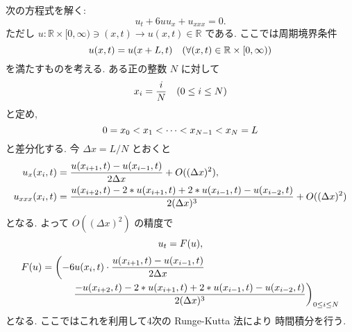 \documentclass[12pt, a4j]{jsarticle}
\newcommand{\R}{\mathbb{R}}
\begin{document}
次の方程式を解く:
\begin{equation}
 u_{t} + 6 u u_{x} + u_{xxx} = 0.
  \label{KdV}
\end{equation}
ただし 
$u:\R \times [0, \infty) \ni (x, t) \to u(x, t) \in \R$
である. ここでは周期境界条件
\begin{equation}
 u(x, t) = u(x + L, t)
  \quad (\forall (x, t) \in \R \times [0, \infty) )
  \notag
\end{equation}
を満たすものを考える. ある正の整数 $N$ に対して
\begin{equation}
 x_{i} = \dfrac{i}{N} \quad (0 \leq i \leq N)
  \notag
\end{equation}
と定め,
\begin{equation}
 0 = x_{0} < x_{1} < \dots < x_{N-1} < x_{N} = L
  \notag
\end{equation}
と差分化する. 今 $\Delta x = L/N$ とおくと
\begin{align}
 u_{x}(x_{i}, t)
 &= \dfrac{u(x_{i+1}, t) - u(x_{i-1}, t)}{2 \Delta x}
    + O((\Delta x)^{2}), \notag \\
 u_{xxx}(x_{i}, t)
 &= \dfrac{
      u(x_{i+2}, t)
      - 2*u(x_{i+1}, t)
      + 2*u(x_{i-1}, t)
      - u(x_{i-2}, t)
    }{2 (\Delta x)^{3}}
    + O((\Delta x)^{2})
 \notag
\end{align}
となる. よって $O((\Delta x)^{2})$ の精度で
\begin{equation}
 u_t = F(u),
  \notag
\end{equation}
\begin{align}
 F(u)
  &= \left(
     - 6 u(x_{i}, t) \cdot
     \dfrac{u(x_{i+1}, t) - u(x_{i-1}, t)}{2 \Delta x}
     \right.
  \notag \\
  & \quad \quad \quad \left.
     \dfrac{
      - u(x_{i+2}, t)
      - 2*u(x_{i+1}, t)
      + 2*u(x_{i-1}, t)
      - u(x_{i-2}, t)
    }{2 (\Delta x)^{3}}
    \right)_{0 \leq i \leq N}
  \notag
\end{align}
となる. ここではこれを利用して4次の Runge-Kutta 法により
時間積分を行う.
\end{document}
